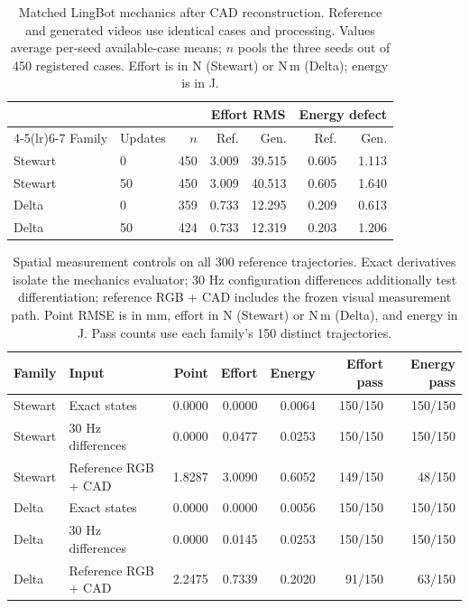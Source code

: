\begin{table}[t]
\caption{Matched LingBot mechanics after CAD reconstruction. Reference and generated videos use identical cases and processing. Values average per-seed available-case means; $n$ pools the three seeds out of 450 registered cases. Effort is in N (Stewart) or N\,m (Delta); energy is in J.}
\label{app:spatial-reference}
\centering\small
\setlength{\tabcolsep}{2.5pt}
\begin{tabular}{llrrrrr}
\toprule
& & & \multicolumn{2}{c}{Effort RMS} & \multicolumn{2}{c}{Energy defect}\\
\cmidrule(lr){4-5}\cmidrule(lr){6-7}
Family & Updates & $n$ & Ref. & Gen. & Ref. & Gen.\\
\midrule
Stewart & 0 & 450 & 3.009 & 39.515 & 0.605 & 1.113 \\
Stewart & 50 & 450 & 3.009 & 40.513 & 0.605 & 1.640 \\
Delta & 0 & 359 & 0.733 & 12.295 & 0.209 & 0.613 \\
Delta & 50 & 424 & 0.733 & 12.319 & 0.203 & 1.206 \\
\bottomrule
\end{tabular}
\end{table}

\begin{table}[t]
\caption{Spatial measurement controls on all 300 reference trajectories. Exact derivatives isolate the mechanics evaluator; 30 Hz configuration differences additionally test differentiation; reference RGB + CAD includes the frozen visual measurement path. Point RMSE is in mm, effort in N (Stewart) or N\,m (Delta), and energy in J. Pass counts use each family's 150 distinct trajectories.}
\label{app:spatial-controls}
\centering\small
\begin{tabular}{llrrrrr}
\toprule
Family & Input & Point & Effort & Energy & Effort pass & Energy pass\\
\midrule
Stewart & Exact states & 0.0000 & 0.0000 & 0.0064 & 150/150 & 150/150 \\
Stewart & 30 Hz differences & 0.0000 & 0.0477 & 0.0253 & 150/150 & 150/150 \\
Stewart & Reference RGB + CAD & 1.8287 & 3.0090 & 0.6052 & 149/150 & 48/150 \\
Delta & Exact states & 0.0000 & 0.0000 & 0.0056 & 150/150 & 150/150 \\
Delta & 30 Hz differences & 0.0000 & 0.0145 & 0.0253 & 150/150 & 150/150 \\
Delta & Reference RGB + CAD & 2.2475 & 0.7339 & 0.2020 & 91/150 & 63/150 \\
\bottomrule
\end{tabular}
\end{table}

